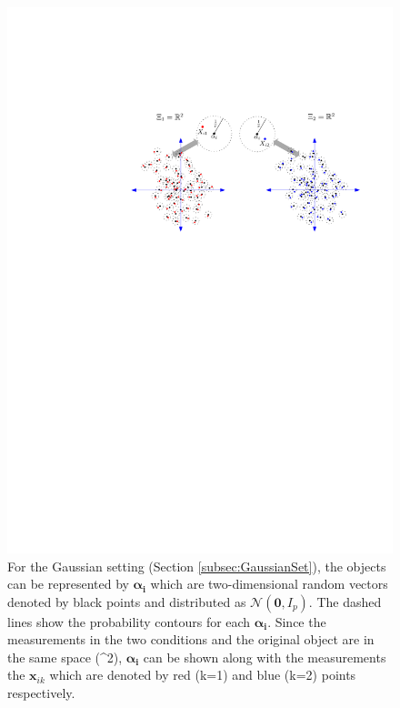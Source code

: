 \documentclass[12pt]{article} %
\begin{document}
    \begin{figure}
	\begin{center}
    \includegraphics[scale=0.55]{MVN_alpha_r_multiple_sancar.pdf}
    \caption{For the  Gaussian setting (Section \ref{subsec:GaussianSet}), the objects can be represented by $\bm{\alpha_i}$  which are two-dimensional random vectors denoted by black points and distributed as $\mathcal{N}(\bm{0},I_p)$. The dashed lines show the probability contours for each  $\bm{\alpha_i}$. Since  the measurements in the two conditions and the original object   are in the same space (^2), $\bm{\alpha_i}$ can be shown along with the measurements the $\bm{x}_{ik}$ which are denoted by red (k=1) and blue (k=2) points respectively.}
\label{fig:Fig1}
	\end{center}
  \end{figure}

\end{document}
